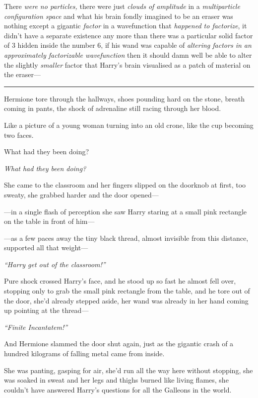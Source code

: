 There \emph{were no particles,} there were just \emph{clouds of
amplitude} in a \emph{multiparticle configuration space} and what his
brain fondly imagined to be an eraser was nothing except a gigantic
\emph{factor} in a wavefunction that \emph{happened to factorize}, it
didn't have a separate existence any more than there was a particular
solid factor of 3 hidden inside the number 6, if his wand was capable of
\emph{altering factors in an approximately factorizable wavefunction}
then it should damn well be able to alter the slightly \emph{smaller}
factor that Harry's brain visualised as a patch of material on the
eraser---

\begin{center}\rule{3in}{0.4pt}\end{center}

Hermione tore through the hallways, shoes pounding hard on the stone,
breath coming in pants, the shock of adrenaline still racing through her
blood.

Like a picture of a young woman turning into an old crone, like the cup
becoming two faces.

What had they been doing?

\emph{What had they been doing?}

She came to the classroom and her fingers slipped on the doorknob at
first, too sweaty, she grabbed harder and the door opened---

---in a single flash of perception she saw Harry staring at a small pink
rectangle on the table in front of him---

---as a few paces away the tiny black thread, almost invisible from this
distance, supported all that weight---

\emph{``Harry get out of the classroom!''}

Pure shock crossed Harry's face, and he stood up so fast he almost fell
over, stopping only to grab the small pink rectangle from the table, and
he tore out of the door, she'd already stepped aside, her wand was
already in her hand coming up pointing at the thread---

\emph{``Finite Incantatem!''}

And Hermione slammed the door shut again, just as the gigantic crash of
a hundred kilograms of falling metal came from inside.

She was panting, gasping for air, she'd run all the way here without
stopping, she was soaked in sweat and her legs and thighs burned like
living flames, she couldn't have answered Harry's questions for all the
Galleons in the world.

